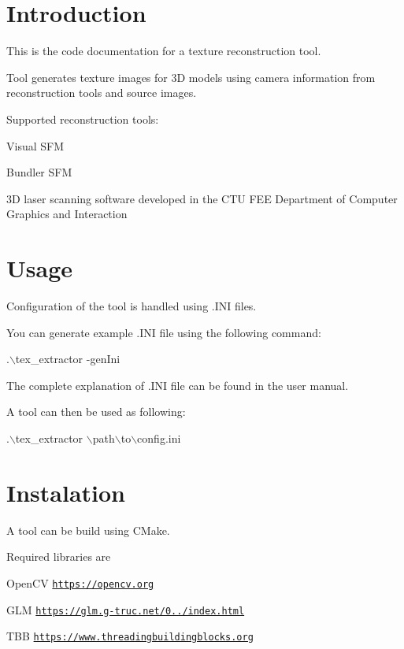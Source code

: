 \hypertarget{index_intro_sec}{}\section{Introduction}\label{index_intro_sec}
This is the code documentation for a texture reconstruction tool.

Tool generates texture images for 3\+D models using camera information from reconstruction tools and source images.

Supported reconstruction tools\+:
\begin{DoxyItemize}
\item Visual S\+F\+M
\item Bundler S\+F\+M
\item 3\+D laser scanning software developed in the C\+T\+U F\+E\+E Department of Computer Graphics and Interaction
\end{DoxyItemize}\hypertarget{index_sec_u}{}\section{Usage}\label{index_sec_u}
Configuration of the tool is handled using .I\+N\+I files.

You can generate example .I\+N\+I file using the following command\+: 
\begin{DoxyCode}
.\(\backslash\)tex\_extractor -genIni
\end{DoxyCode}
 The complete explanation of .I\+N\+I file can be found in the user manual.

A tool can then be used as following\+: 
\begin{DoxyCode}
.\(\backslash\)tex\_extractor \(\backslash\)path\(\backslash\)to\(\backslash\)config.ini
\end{DoxyCode}
 \hypertarget{index_sec_i}{}\section{Instalation}\label{index_sec_i}
A tool can be build using C\+Make.

Required libraries are
\begin{DoxyItemize}
\item Open\+C\+V \href{https://opencv.org}{\tt https\+://opencv.\+org}
\item G\+L\+M \href{https://glm.g-truc.net/0.9.8/index.html}{\tt https\+://glm.\+g-\/truc.\+net/0../index.\+html}
\item T\+B\+B \href{https://www.threadingbuildingblocks.org}{\tt https\+://www.\+threadingbuildingblocks.\+org} 
\end{DoxyItemize}